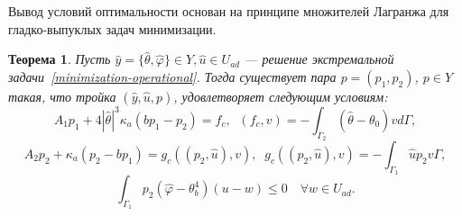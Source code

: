 \documentclass[10pt]{article}
\newtheorem{thm}{\indent Теорема}
\begin{document}
    Вывод условий оптимальности основан на принципе множителей
    Лагранжа для гладко-выпуклых задач минимизации.
    \begin{thm}
        \label{adjoint_theorem}
        Пусть $\hat{y}=\{\hat{\theta},\hat{\varphi} \} \in Y, \hat{u} \in U_{ad}$ --- решение
        экстремальной задачи~\eqref{minimization-operational}.
        Тогда существует пара $p = (p_1, p_2)$, $p \in Y$
        такая, что тройка $(\hat{y}, \hat{u}, p)$, удовлетворяет следующим условиям:
        \begin{equation}
            \label{theorem_2_eq1}
            A_1 p_1 + 4 |\hat{\theta}|^3 \kappa_a(b p_1 - p_2) = f_c, \;\;
            (f_c,v) = - \int_{\Gamma_2} (\hat{\theta} - \theta_0) v d\Gamma,
        \end{equation}
        \begin{equation}
            \label{theorem_2_eq2}
            A_2 p_2 + \kappa_a (p_2-b p_1) = g_c(( p_2, \hat{u}),v), \;\;
            g_c(( p_2, \hat{u}),v) = -\int_{\Gamma_1} \hat{u} p_2 v\Gamma,
        \end{equation}
        \begin{equation}
            \label{theorem_2_eq3}
            \int_{\Gamma_1} p_2 (\hat{\varphi} - \theta_b^4)(u-w) \leq 0
            \quad \forall w \in U_{ad}.
        \end{equation}
    \end{thm}
\end{document}
